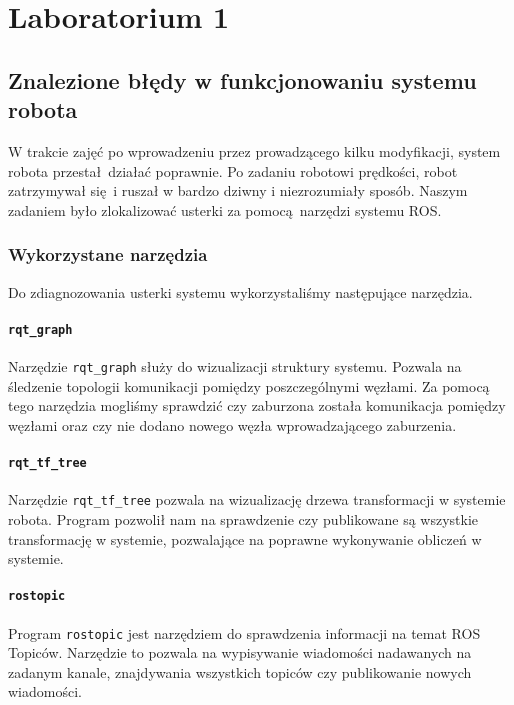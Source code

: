 \documentclass{mwrep}
\begin{document}
\tableofcontents

\chapter{Laboratorium 1}

\section{Znalezione błędy w funkcjonowaniu systemu robota}
W trakcie zajęć po wprowadzeniu przez prowadzącego kilku modyfikacji,
system robota przestał działać poprawnie. Po zadaniu robotowi prędkości, 
robot zatrzymywał się i ruszał w bardzo dziwny i niezrozumiały sposób.
Naszym zadaniem było zlokalizować usterki za pomocą narzędzi
systemu ROS. 

\subsection{Wykorzystane narzędzia}
Do zdiagnozowania usterki systemu wykorzystaliśmy następujące narzędzia.

\subsubsection{\texttt{rqt\_{}graph}}
Narzędzie \texttt{rqt\_{}graph} służy do wizualizacji struktury systemu. Pozwala na
śledzenie topologii komunikacji pomiędzy poszczególnymi węzłami. Za pomocą tego narzędzia
mogliśmy sprawdzić czy zaburzona została komunikacja pomiędzy węzłami oraz czy
nie dodano nowego węzła wprowadzającego zaburzenia.

\subsubsection{\texttt{rqt\_{}tf\_{}tree}}
Narzędzie \texttt{rqt\_{}tf\_{}tree} pozwala na wizualizację drzewa transformacji 
w systemie robota. Program pozwolił nam na sprawdzenie czy publikowane są wszystkie
transformację w systemie, pozwalające na poprawne wykonywanie obliczeń w systemie.

\subsubsection{\texttt{rostopic}}
Program \texttt{rostopic} jest narzędziem do sprawdzenia informacji
na temat ROS Topiców. Narzędzie to pozwala na wypisywanie wiadomości 
nadawanych na zadanym kanale, znajdywania wszystkich topiców czy publikowanie
nowych wiadomości.
\end{document}
